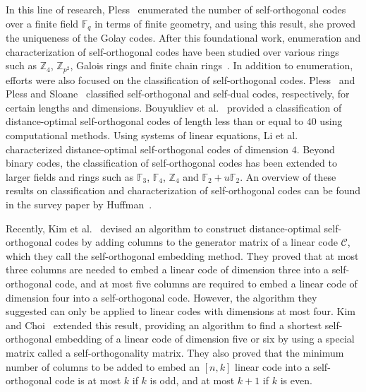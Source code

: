 \documentclass{article}
\theoremstyle{definition}
\theoremstyle{remark}
\begin{document}
In this line of research, Pless~\cite{Pless1968} enumerated the number of self-orthogonal codes over a finite field $\mathbb{F}_q$ in terms of finite geometry, and using this result, she proved the uniqueness of the Golay codes. After this foundational work, enumeration and characterization of self-orthogonal codes have been studied over various rings such as $\mathbb{Z}_4$, $\mathbb{Z}_{p^2}$, Galois rings and finite chain rings~\cite{Betty2009, Leon1982, Nagata2009, Nagata2013, Vasquez2019, Yadav2021}. In addition to enumeration, efforts were also focused on the classification of self-orthogonal codes. Pless~\cite{Pless1972} and Pless and Sloane~\cite{Pless1975} classified self-orthogonal and self-dual codes, respectively, for certain lengths and dimensions. Bouyukliev et al.~\cite{Bouyukliev2006} provided a classification of distance-optimal self-orthogonal codes of length less than or equal to $40$ using computational methods. Using systems of linear equations, Li et al.~\cite{Li2008} characterized distance-optimal self-orthogonal codes of dimension $4$. Beyond binary codes, the classification of self-orthogonal codes has been extended to larger fields and rings such as $\mathbb{F}_3$, $\mathbb{F}_4$, $\mathbb{Z}_4$ and $\mathbb{F}_2+u\mathbb{F}_2$. An overview of these results on classification and characterization of self-orthogonal codes can be found in the survey paper by Huffman~\cite{Huffman2005}.

Recently, Kim et al.~\cite{Kim2021} devised an algorithm to construct distance-optimal self-orthogonal codes by adding columns to the generator matrix of a linear code $\mathcal{C}$, which they call the self-orthogonal embedding method. They proved that at most three columns are needed to embed a linear code of dimension three into a self-orthogonal code, and at most five columns are required to embed a linear code of dimension four into a self-orthogonal code. However, the algorithm they suggested can only be applied to linear codes with dimensions at most four. Kim and Choi~\cite{Kim2022} extended this result, providing an algorithm to find a shortest self-orthogonal embedding of a linear code of dimension five or six by using a special matrix called a self-orthogonality matrix. They also proved that the minimum number of columns to be added to embed an $[n, k]$ linear code into a self-orthogonal code is at most $k$ if $k$ is odd, and at most $k+1$ if $k$ is even.
\end{document}
